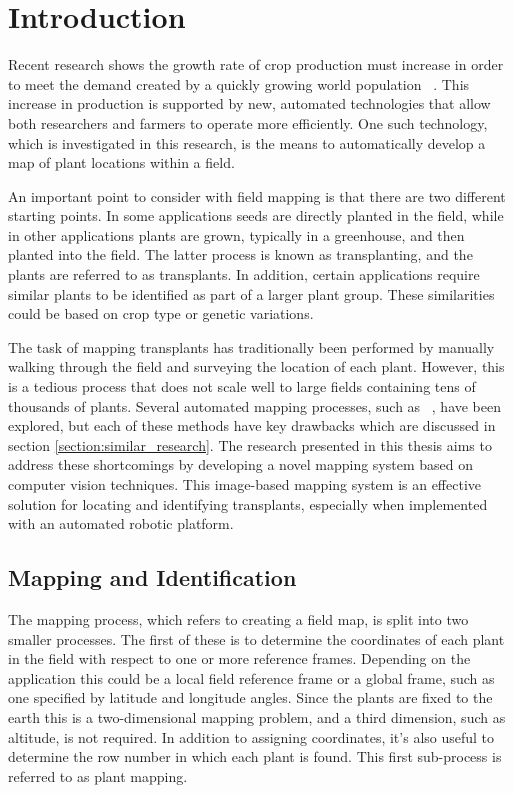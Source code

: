 
\cleardoublepage

\chapter{Introduction}
\label{introduction}

Recent research shows the growth rate of crop production must increase in order to meet the demand created by a quickly growing world population ~\citep{tester:2010}.  This increase in production is supported by new, automated technologies that allow both researchers and farmers to operate more efficiently. One such technology, which is investigated in this research, is the means to automatically develop a map of plant locations within a field. 
 
An important point to consider with field mapping is that there are two different starting points.  In some applications seeds are directly planted in the field, while in other applications plants are grown, typically in a greenhouse, and then planted into the field.  The latter process is known as transplanting, and the plants are referred to as transplants.  In addition, certain applications require similar plants to be identified as part of a larger plant group.  These similarities could be based on crop type or genetic variations. 

The task of mapping transplants has traditionally been performed by manually walking through the field and surveying the location of each plant. However, this is a tedious process that does not scale well to large fields containing tens of thousands of plants.  Several automated mapping processes, such as ~\citep{Perez-Ruiz:2012}, have been explored, but each of these methods have key drawbacks which are discussed in section \ref{section:similar_research}.  The research presented in this thesis aims to address these shortcomings by developing a novel mapping system based on computer vision techniques.  This image-based mapping system is an effective solution for locating and identifying transplants, especially when implemented with an automated robotic platform. 

\section{Mapping and Identification}

The mapping process, which refers to creating a field map, is split into two smaller processes.  The first of these is to determine the coordinates of each plant in the field with respect to one or more reference frames.  Depending on the application this could be a local field reference frame or a global frame, such as one specified by latitude and longitude angles.  Since the plants are fixed to the earth this is a two-dimensional mapping problem, and a third dimension, such as altitude, is not required.  In addition to assigning coordinates, it's also useful to determine the row number in which each plant is found.  This first sub-process is referred to as plant mapping. 

